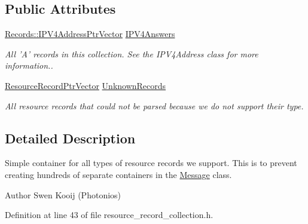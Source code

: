 \subsection*{Public Attributes}
\begin{DoxyCompactItemize}
\item 
\hyperlink{namespace_senergy_1_1_dns_1_1_records_a5b9115e6124c4999bbb000e69cfe5d2c}{Records\-::\-I\-P\-V4\-Address\-Ptr\-Vector} \hyperlink{class_senergy_1_1_dns_1_1_resource_record_collection_a0ca3a73fcaabee1703b18c9c8ca453f9}{I\-P\-V4\-Answers}
\begin{DoxyCompactList}\small\item\em All 'A' records in this collection. See the I\-P\-V4\-Address class for more information.. \end{DoxyCompactList}\item 
\hyperlink{namespace_senergy_1_1_dns_ad5ef448b2b508ce86c6ed91dccc10d3e}{Resource\-Record\-Ptr\-Vector} \hyperlink{class_senergy_1_1_dns_1_1_resource_record_collection_a1ad19da9ca3420c4aa1ad865099e387d}{Unknown\-Records}
\begin{DoxyCompactList}\small\item\em All resource records that could not be parsed because we do not support their type. \end{DoxyCompactList}\end{DoxyCompactItemize}


\subsection{Detailed Description}
Simple container for all types of resource records we support. This is to prevent creating hundreds of separate containers in the \hyperlink{class_senergy_1_1_dns_1_1_message}{Message} class. 

\begin{DoxyAuthor}{Author}
Swen Kooij (Photonios) 
\end{DoxyAuthor}


Definition at line 43 of file resource\-\_\-record\-\_\-collection.\-h.



